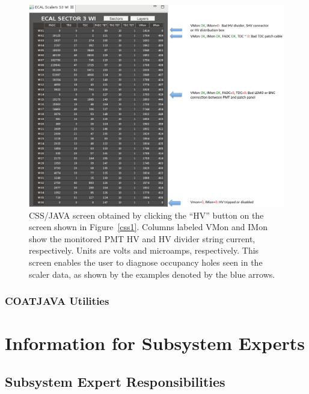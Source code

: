 \documentclass[letterpaper,10pt]{article}
\begin{document}
\begin{figure}[htbp]
  \centering
  \includegraphics[width= 7in, keepaspectratio = true]{css3}
  \vspace{2mm}
  \caption{CSS/JAVA screen obtained by clicking the ``HV'' button on the screen shown in Figure~\ref{css1}.   Columns labeled VMon and IMon show the monitored PMT HV and HV divider string current, respectively.  Units are volts and microamps, respectively.  This screen enables the user to diagnose occupancy holes seen in the scaler data, as shown by the examples denoted by the blue arrows. }
\label{css3}
\end{figure}

\subsubsection{COATJAVA Utilities}

\clearpage
\vfil
\eject

\section{Information for Subsystem Experts}

\subsection{Subsystem Expert Responsibilities}
\end{document}
